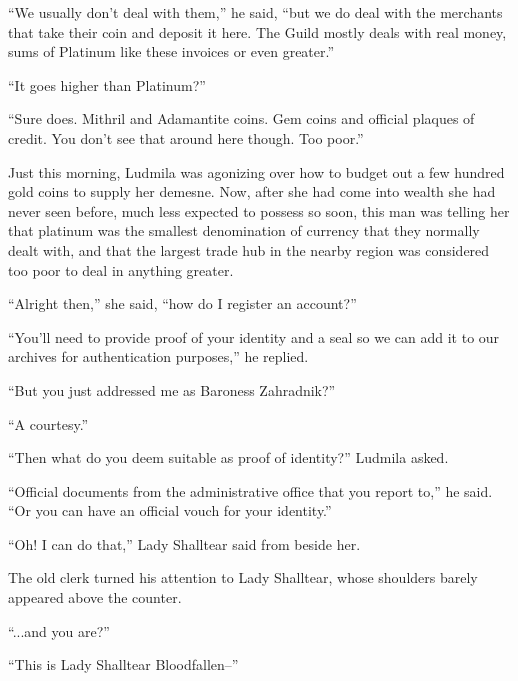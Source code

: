 “We usually don’t deal with them,” he said, “but we do deal with the merchants that take their coin and deposit it here. The Guild mostly deals with real money, sums of Platinum like these invoices or even greater.”

 

“It goes higher than Platinum?”

 

“Sure does. Mithril and Adamantite coins. Gem coins and official plaques of credit. You don’t see that around here though. Too poor.”

 

Just this morning, Ludmila was agonizing over how to budget out a few hundred gold coins to supply her demesne. Now, after she had come into wealth she had never seen before, much less expected to possess so soon, this man was telling her that platinum was the smallest denomination of currency that they normally dealt with, and that the largest trade hub in the nearby region was considered too poor to deal in anything greater.

 

“Alright then,” she said, “how do I register an account?”

 

“You’ll need to provide proof of your identity and a seal so we can add it to our archives for authentication purposes,” he replied.

 

“But you just addressed me as Baroness Zahradnik?”

 

“A courtesy.”

 

“Then what do you deem suitable as proof of identity?” Ludmila asked.

 

“Official documents from the administrative office that you report to,” he said. “Or you can have an official vouch for your identity.”

 

“Oh! I can do that,” Lady Shalltear said from beside her.

 

The old clerk turned his attention to Lady Shalltear, whose shoulders barely appeared above the counter.

 

“...and you are?”

 

“This is Lady Shalltear Bloodfallen–”

